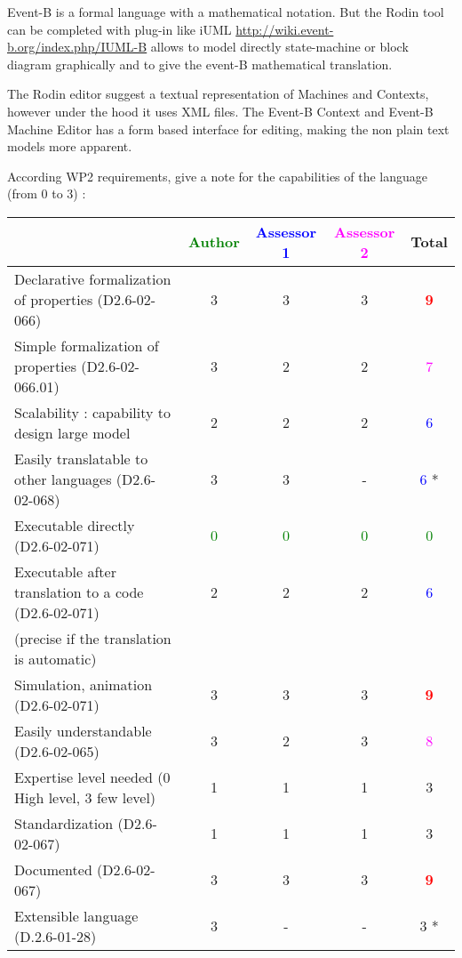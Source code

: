 \begin{author_comment}
Event-B  is a formal language with a mathematical notation. But the Rodin tool can be completed with plug-in like iUML \url{http://wiki.event-b.org/index.php/IUML-B} allows to model directly state-machine or block diagram  graphically and to  give the event-B mathematical translation.
\end{author_comment}

\begin{assessor2}
  The Rodin editor suggest a textual representation of Machines and
  Contexts, however under the hood it uses XML files. The Event-B
  Context and Event-B Machine Editor has a form based interface for
  editing, making the non plain text models more apparent.
\end{assessor2}

According WP2 requirements, give a note for the capabilities of the language (from 0 to 3) :

\begin{tabular}{|l | c | c | c | c|}
\hline
& \textcolor{green}{Author} & \textcolor{blue}{Assessor 1} & \textcolor{magenta}{Assessor 2} & Total \\
\hline
Declarative formalization of properties (D2.6-02-066) & 3    & 3    & 3    & \textcolor{red}{\textbf{9}} \\
\hline
Simple formalization of properties (D2.6-02-066.01) & 3    & 2    & 2    & \textcolor{magenta}{7} \\
\hline
Scalability : capability to design large model & 2    & 2    & 2    & \textcolor{blue}{6} \\
\hline
Easily translatable to other languages (D2.6-02-068) & 3    & 3    & - & \textcolor{blue}{6} * \\
\hline
Executable directly (D2.6-02-071) & \textcolor{green}{0} & \textcolor{green}{0} & \textcolor{green}{0} & \textcolor{green}{0} \\
\hline
Executable after translation to a code (D2.6-02-071) & 2    & 2    & 2    & \textcolor{blue}{6} \\
(precise if the translation is automatic) & & & & \\
\hline
Simulation, animation (D2.6-02-071) & 3    & 3    & 3    & \textcolor{red}{\textbf{9}} \\
\hline
Easily understandable (D2.6-02-065) & 3    & 2    & 3    & \textcolor{magenta}{8} \\
\hline
Expertise level needed (0 High level, 3 few level) & 1    & 1    & 1    & 3    \\
\hline
Standardization (D2.6-02-067) & 1    & 1    & 1    & 3   \\
\hline
Documented (D2.6-02-067) & 3    & 3    & 3    & \textcolor{red}{\textbf{9}} \\
\hline
Extensible language (D.2.6-01-28) & 3    & - & - & 3   * \\
\hline
\end{tabular}

